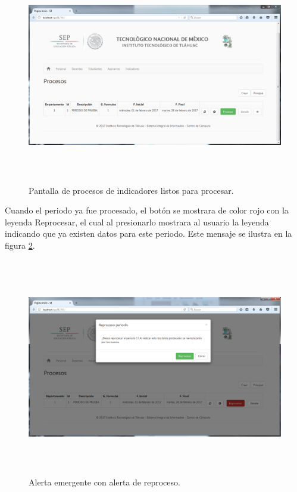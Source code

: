 		    \begin{figure}[]
		        \centering
		        \includegraphics[width=16cm, height=9.5cm]{figuras/ProcesoProcesar}
		        \caption{Pantalla de procesos de indicadores listos para procesar.}
		        \label{fig_ProcesoProcesar}
		    \end{figure}

		    Cuando el periodo ya fue procesado, el bot\'on se mostrara de color rojo con la leyenda Reprocesar, el cual al presionarlo mostrara al usuario la leyenda indicando que ya existen datos para este periodo. Este mensaje se ilustra en la figura \ref{fig_ProcesoReprocesar}.\\

		    \begin{figure}[]
		        \centering
		        \includegraphics[width=16cm, height=9.5cm]{figuras/ProcesoReprocesar}
		        \caption{Alerta emergente con alerta de reproceso.}
		        \label{fig_ProcesoReprocesar}
		    \end{figure}

